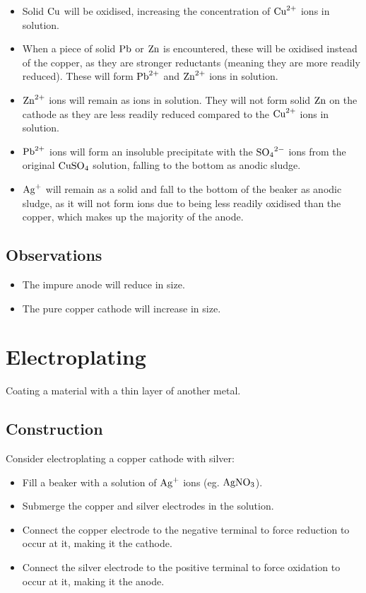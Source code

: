 \documentclass[a4paper,11pt]{article}
\begin{document}
\begin{itemize}
\item Solid $\ce{Cu}$ will be oxidised, increasing the concentration of
	$\ce{Cu^{2+}}$ ions in solution.
\item When a piece of solid $\ce{Pb}$ or $\ce{Zn}$ is encountered, these will
	be oxidised instead of the copper, as they are stronger reductants (meaning
	they are more readily reduced). These will form $\ce{Pb^{2+}}$ and
	$\ce{Zn^{2+}}$ ions in solution.
\item $\ce{Zn^{2+}}$ ions will remain as ions in solution. They will not form
	solid $\ce{Zn}$ on the cathode as they are less readily reduced compared to
	the $\ce{Cu^{2+}}$ ions in solution.
\item $\ce{Pb^{2+}}$ ions will form an insoluble precipitate with the
	$\ce{SO4^{2-}}$ ions from the original $\ce{CuSO4}$ solution, falling to the
	bottom as anodic sludge.
\item $\ce{Ag+}$ will remain as a solid and fall to the bottom of the beaker
	as anodic sludge, as it will not form ions due to being less readily
	oxidised than the copper, which makes up the majority of the anode.
\end{itemize}

\subsection{Observations}

\begin{itemize}
\item The impure anode will reduce in size.
\item The pure copper cathode will increase in size.
\end{itemize}



\section{Electroplating}

Coating a material with a thin layer of another metal.

\subsection{Construction}


Consider electroplating a copper cathode with silver:

\begin{itemize}
\item Fill a beaker with a solution of $\ce{Ag+}$ ions (eg. $\ce{AgNO3}$).
\item Submerge the copper and silver electrodes in the solution.
\item Connect the copper electrode to the negative terminal to force reduction
	to occur at it, making it the cathode.
\item Connect the silver electrode to the positive terminal to force oxidation
	to occur at it, making it the anode.
\end{itemize}
\end{document}
